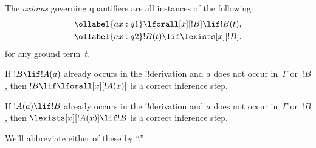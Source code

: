 \documentclass[../../include/open-logic-section]{subfiles}
\begin{document}


\begin{defn}
The \emph{axioms} governing quantifiers are
all instances of the following:
\begin{align}
\ollabel{ax:q1} & \lforall[x][!B] \lif !B(t), \\
\ollabel{ax:q2} & !B(t) \lif \lexists[x][!B].
\end{align}
for any ground term~$t$.
\end{defn}

\begin{defn}
\item If $!B \lif !A(a)$ already occurs in the !!{derivation} and $a$
  does not occur in~$\Gamma$ or~$!B$, then $!B \lif
  \lforall[x][!A(x)]$ is a correct inference step.
\item If $!A(a) \lif !B$ already occurs in the !!{derivation} and $a$
  does not occur in~$\Gamma$ or~$!B$, then $\lexists[x][!A(x)] \lif
  !B$ is a correct inference step.
\end{defn}

We'll abbreviate either of these by ``\QR.''
\end{document}
